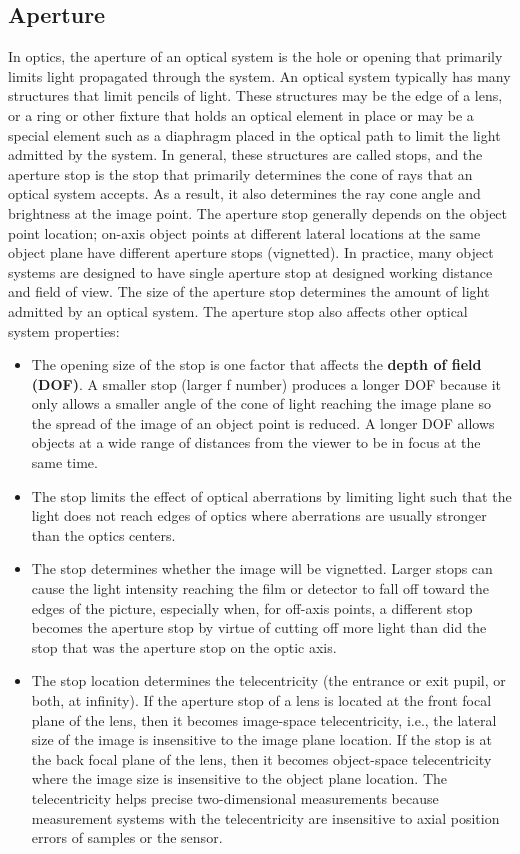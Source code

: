 \documentclass[10pt]{article}
\begin{document}
\begin{multicols}{2}
\subsection{Aperture}
In optics, the aperture of an optical system is the hole or opening that primarily limits light propagated through the system. An optical system typically has many structures that limit pencils of light. These structures may be the edge of a lens, or a ring or other fixture that holds an optical element in place or may be a special element such as a diaphragm placed in the optical path to limit the light admitted by the system.
In general, these structures are called stops, and the aperture stop is the stop that primarily determines the cone of rays that an optical system accepts. As a result, it also determines the ray cone angle and brightness at the image point. The aperture stop generally depends on the object point location; on-axis object points at different lateral locations at the same object plane have different aperture stops (vignetted). In practice, many object systems are designed to have single aperture stop at designed working distance and field of view.
\newline \newline
The size of the aperture stop determines the amount of light admitted by an optical system. The aperture stop also affects other optical system properties:
\begin{itemize}
    \item The opening size of the stop is one factor that affects the \textbf{depth of field (DOF)}. A smaller stop (larger f number) produces a longer DOF because it only allows a smaller angle of the cone of light reaching the image plane so the spread of the image of an object point is reduced. A longer DOF allows objects at a wide range of distances from the viewer to be in focus at the same time.
    \item The stop limits the effect of optical aberrations by limiting light such that the light does not reach edges of optics where aberrations are usually stronger than the optics centers.
    \item The stop determines whether the image will be vignetted. Larger stops can cause the light intensity reaching the film or detector to fall off toward the edges of the picture, especially when, for off-axis points, a different stop becomes the aperture stop by virtue of cutting off more light than did the stop that was the aperture stop on the optic axis.
    \item The stop location determines the telecentricity (the entrance or exit pupil, or both, at infinity). If the aperture stop of a lens is located at the front focal plane of the lens, then it becomes image-space telecentricity, i.e., the lateral size of the image is insensitive to the image plane location. If the stop is at the back focal plane of the lens, then it becomes object-space telecentricity where the image size is insensitive to the object plane location. The telecentricity helps precise two-dimensional measurements because measurement systems with the telecentricity are insensitive to axial position errors of samples or the sensor.

\end{itemize}
\end{multicols}
\end{document}

